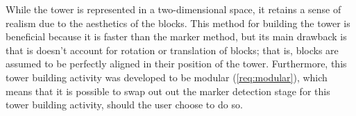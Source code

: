While the tower is represented in a two-dimensional space, it retains a sense of realism due to the aesthetics of the blocks. This method for building the tower is beneficial because it is faster than the marker method, but its main drawback is that is doesn't account for rotation or translation of blocks; that is, blocks are assumed to be perfectly aligned in their position of the tower. Furthermore, this tower building activity was developed to be modular (\cref{req:modular}), which means that it is possible to swap out out the marker detection stage for this tower building activity, should the user choose to do so.

\begin{figure}[ht] %

\hspace*{\fill}
\begin{subfigure}{0.22\textwidth}

\end{subfigure}
\end{figure}
